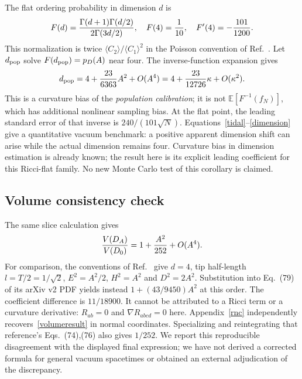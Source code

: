 \documentclass[11pt,a4paper]{article}
\newcommand{\E}{\mathbb E}
\begin{document}
The flat ordering probability in dimension $d$ is
\begin{equation}
 F(d)={\Gamma(d+1)\Gamma(d/2)\over2\Gamma(3d/2)},\quad
 F(4)={1\over10},\quad F'(4)=-{101\over1200}.
\end{equation}
This normalization is twice $\langle C_2\rangle/\langle C_1\rangle^2$
in the Poisson convention of Ref.~\cite{roy}. Let $d_{\rm pop}$ solve
$F(d_{\rm pop})=p_D(A)$ near four. The inverse-function expansion gives
\begin{equation}
 d_{\rm pop}=4+{23\over6363}A^2+O(A^4)
            =4+{23\over12726}\kappa+O(\kappa^2). \label{dimension}
\end{equation}
This is a curvature bias of the \emph{population calibration}; it is not
$\E[F^{-1}(f_N)]$, which has additional nonlinear sampling bias. At the flat
point, the leading standard error of that inverse is
$240/(101\sqrt N)$. Equations~\eqref{tidal}--\eqref{dimension} give a quantitative
vacuum benchmark: a positive apparent dimension shift can arise while the
actual dimension remains four. Curvature bias in dimension estimation is
already known; the result here is its explicit leading coefficient for this
Ricci-flat family. No new Monte Carlo test of this corollary is claimed.

\subsection{Volume consistency check}\label{volumecheck}
The same slice calculation gives
\begin{equation}
 {V(D_A)\over V(D_0)}=1+{A^2\over252}+O(A^4). \label{volumeresult}
\end{equation}
For comparison, the conventions of Ref.~\cite{wang} give
$d=4$, tip half-length $l=T/2=1/\sqrt2$,
$E^2=A^2/2$, $H^2=A^2$ and $D^2=2A^2$.
Substitution into Eq.~(79) of its arXiv v2 PDF yields instead
$1+(43/9450)A^2$ at this order. The coefficient difference is $11/18900$.
It cannot be attributed to a Ricci term or a curvature derivative:
$R_{ab}=0$ and $\nabla R_{abcd}=0$ here. Appendix~\ref{rnc} independently
recovers~\eqref{volumeresult} in normal coordinates. Specializing and
reintegrating that reference's Eqs.~(74),(76) also gives $1/252$.
We report this reproducible disagreement with the displayed final expression;
we have not derived a corrected formula for general vacuum spacetimes or
obtained an external adjudication of the discrepancy.
\end{document}
